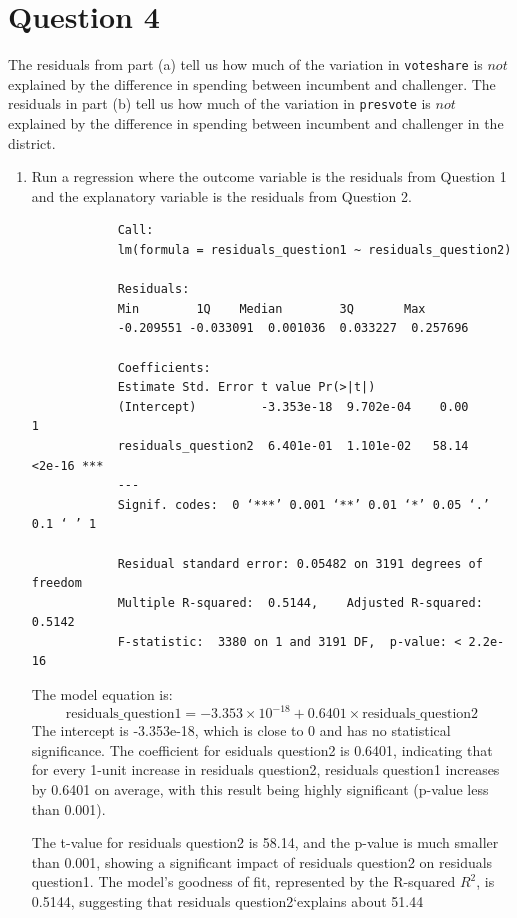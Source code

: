 \documentclass[12pt,letterpaper]{article}
\begin{document}
\section*{Question 4}
\noindent The residuals from part (a) tell us how much of the variation in \texttt{voteshare} is $not$ explained by the difference in spending between incumbent and challenger. The residuals in part (b) tell us how much of the variation in \texttt{presvote} is $not$ explained by the difference in spending between incumbent and challenger in the district.
	\begin{enumerate}
		\item Run a regression where the outcome variable is the residuals from Question 1 and the explanatory variable is the residuals from Question 2.
		  
		\begin{verbatim}
			Call:
			lm(formula = residuals_question1 ~ residuals_question2)
			
			Residuals:
			Min        1Q    Median        3Q       Max 
			-0.209551 -0.033091  0.001036  0.033227  0.257696 
			
			Coefficients:
			Estimate Std. Error t value Pr(>|t|)    
			(Intercept)         -3.353e-18  9.702e-04    0.00        1    
			residuals_question2  6.401e-01  1.101e-02   58.14   <2e-16 ***
			---
			Signif. codes:  0 ‘***’ 0.001 ‘**’ 0.01 ‘*’ 0.05 ‘.’ 0.1 ‘ ’ 1
			
			Residual standard error: 0.05482 on 3191 degrees of freedom
			Multiple R-squared:  0.5144,	Adjusted R-squared:  0.5142 
			F-statistic:  3380 on 1 and 3191 DF,  p-value: < 2.2e-16
		\end{verbatim} 
		  
		The model equation is:
		\[
		\text{residuals\_question1} = -3.353 \times 10^{-18} + 0.6401 \times \text{residuals\_question2}
		\]
		The intercept is -3.353e-18, which is close to 0 and has no statistical significance. The coefficient for esiduals question2 is 0.6401, indicating that for every 1-unit increase in residuals question2, residuals question1 increases by 0.6401 on average, with this result being highly significant (p-value less than 0.001).
		
		The t-value for residuals question2 is 58.14, and the p-value is much smaller than 0.001, showing a significant impact of residuals question2 on residuals question1. The model's goodness of fit, represented by the R-squared \( R^2 \), is 0.5144, suggesting that residuals question2`explains about 51.44%
		

\end{enumerate}
\end{document}
